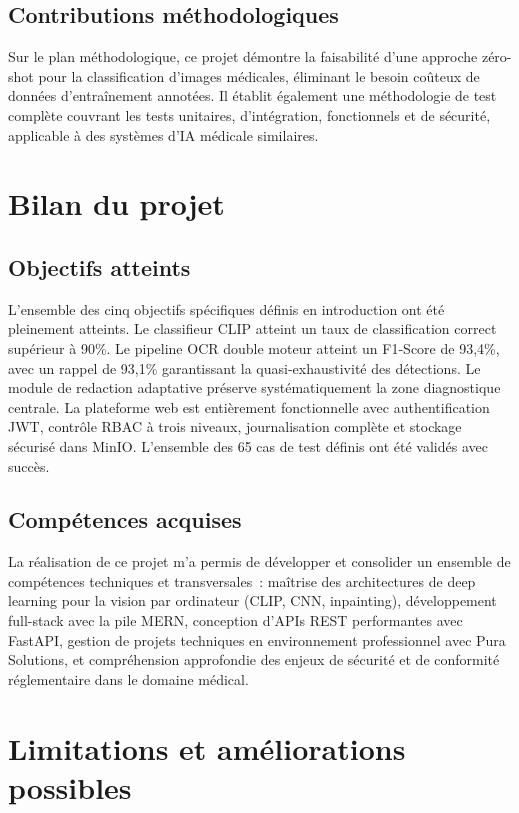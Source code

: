 \subsection*{Contributions méthodologiques}

Sur le plan méthodologique, ce projet démontre la faisabilité d'une approche zéro-shot pour la classification d'images médicales, éliminant le besoin coûteux de données d'entraînement annotées. Il établit également une méthodologie de test complète couvrant les tests unitaires, d'intégration, fonctionnels et de sécurité, applicable à des systèmes d'IA médicale similaires.

\section*{Bilan du projet}

\subsection*{Objectifs atteints}

L'ensemble des cinq objectifs spécifiques définis en introduction ont été pleinement atteints. Le classifieur CLIP atteint un taux de classification correct supérieur à 90\%. Le pipeline OCR double moteur atteint un F1-Score de 93,4\%, avec un rappel de 93,1\% garantissant la quasi-exhaustivité des détections. Le module de redaction adaptative préserve systématiquement la zone diagnostique centrale. La plateforme web est entièrement fonctionnelle avec authentification JWT, contrôle RBAC à trois niveaux, journalisation complète et stockage sécurisé dans MinIO. L'ensemble des 65 cas de test définis ont été validés avec succès.

\subsection*{Compétences acquises}

La réalisation de ce projet m'a permis de développer et consolider un ensemble de compétences techniques et transversales~: maîtrise des architectures de deep learning pour la vision par ordinateur (CLIP, CNN, inpainting), développement full-stack avec la pile MERN, conception d'APIs REST performantes avec FastAPI, gestion de projets techniques en environnement professionnel avec Pura Solutions, et compréhension approfondie des enjeux de sécurité et de conformité réglementaire dans le domaine médical.

\section*{Limitations et améliorations possibles}

